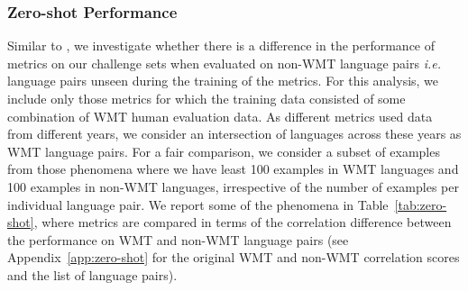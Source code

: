 \documentclass[11pt]{article}
\begin{document}
\subsubsection{Zero-shot Performance}
\label{subsec:zero-shot}

Similar to \citet{kocmi-etal-2021-ship}, we investigate whether there is a difference in the performance of metrics on our challenge sets when evaluated on non-WMT language pairs \textit{i.e.} language pairs unseen during the training of the metrics. For this analysis, we include only those metrics for which the training data consisted of some combination of WMT human evaluation data. As different metrics used data from different years, we consider an intersection of languages across these years as WMT language pairs. For a fair comparison, we consider a subset of examples from those phenomena where we have least 100 examples in WMT languages and 100 examples in non-WMT languages, irrespective of the number of examples per individual language pair. We report some of the phenomena in Table~\ref{tab:zero-shot}, where metrics are compared in terms of the correlation difference between the performance on WMT and non-WMT language pairs (see Appendix~\ref{app:zero-shot} for the original WMT and non-WMT correlation scores and the list of language pairs).
\end{document}
